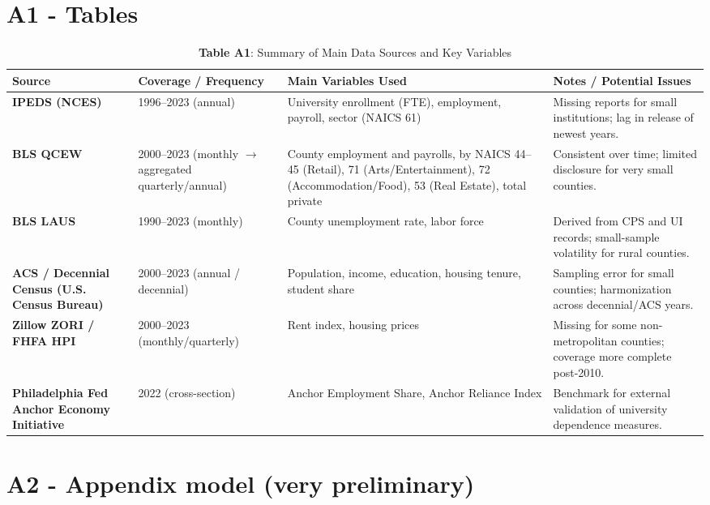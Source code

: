 
\newpage


\section*{A1 - Tables}

\begin{table}[H]
	\centering
	\footnotesize
	\caption*{\textbf{Table A1}: Summary of Main Data Sources and Key Variables}
	\label{tab:data_summary}
	\begin{tabular}{p{3cm} p{3cm} p{5cm} p{4cm}}
		\toprule
		\textbf{Source} & \textbf{Coverage / Frequency} & \textbf{Main Variables Used} & \textbf{Notes / Potential Issues} \\ 
		\midrule
		\textbf{IPEDS (NCES)} & 1996–2023 (annual) & University enrollment (FTE), employment, payroll, sector (NAICS 61) & Missing reports for small institutions; lag in release of newest years. \\[0.3em]
		\textbf{BLS QCEW} & 2000–2023 (monthly $\to$ aggregated quarterly/annual) & County employment and payrolls, by NAICS 44–45 (Retail), 71 (Arts/Entertainment), 72 (Accommodation/Food), 53 (Real Estate), total private & Consistent over time; limited disclosure for very small counties. \\[0.3em]
		\textbf{BLS LAUS} & 1990–2023 (monthly) & County unemployment rate, labor force & Derived from CPS and UI records; small-sample volatility for rural counties. \\[0.3em]
		\textbf{ACS / Decennial Census (U.S. Census Bureau)} & 2000–2023 (annual / decennial) & Population, income, education, housing tenure, student share & Sampling error for small counties; harmonization across decennial/ACS years. \\[0.3em]
		\textbf{Zillow ZORI / FHFA HPI} & 2000–2023 (monthly/quarterly) & Rent index, housing prices & Missing for some non-metropolitan counties; coverage more complete post-2010. \\[0.3em]
		\textbf{Philadelphia Fed Anchor Economy Initiative} & 2022 (cross-section) & Anchor Employment Share, Anchor Reliance Index & Benchmark for external validation of university dependence measures. \\
		\bottomrule
	\end{tabular}
\end{table}

\newpage
\section*{A2 - Appendix model (very preliminary)}


